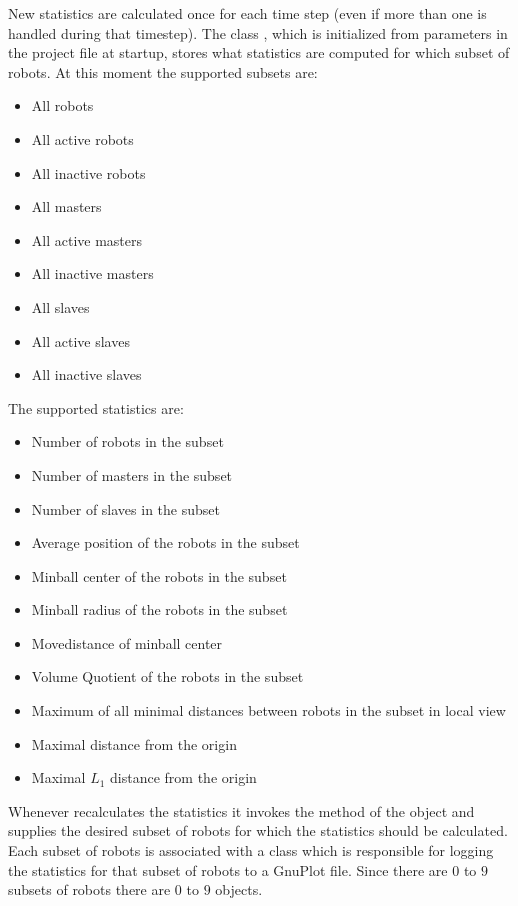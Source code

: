 \noindent
New statistics are calculated once for each time step (even if more than one  is handled during that timestep). The class , which is initialized from parameters in the project file at startup, stores what statistics are computed for which subset of robots. At this moment the supported subsets are:
\begin{itemize}
\item All robots
\item All active robots
\item All inactive robots
\item All masters
\item All active masters
\item All inactive masters
\item All slaves
\item All active slaves
\item All inactive slaves
\end{itemize}
The supported statistics are:
\begin{itemize}
\item Number of robots in the subset
\item Number of masters in the subset
\item Number of slaves in the subset
\item Average position of the robots in the subset
\item Minball center of the robots in the subset
\item Minball radius of the robots in the subset
\item Movedistance of minball center
\item Volume Quotient of the robots in the subset
\item Maximum of all minimal distances between robots in the subset in local view
\item Maximal distance from the origin
\item Maximal $L_1$ distance from the origin
\end{itemize}

\noindent
Whenever  recalculates the statistics it invokes the  method of the  object and supplies the desired subset of robots for which the statistics should be calculated. Each subset of robots is associated with a  class which is responsible for logging the statistics for that subset of robots to a GnuPlot file. Since there are $0$ to $9$ subsets of robots there are $0$ to $9$  objects.\smallskip

